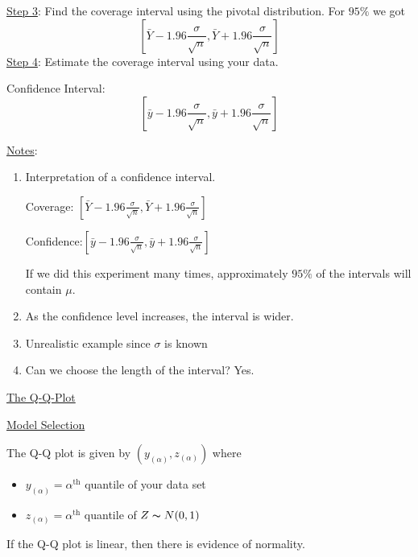 \underline{Step 3}: Find the coverage interval using the pivotal distribution.
For $ 95\% $ we got
\[ \left[ \bar{Y}-1.96\frac{\sigma}{\sqrt{n}},
        \bar{Y}+1.96\frac{\sigma}{\sqrt{n}}\right] \] \underline{Step 4}: Estimate
the coverage interval using your data.

Confidence Interval:
\[ \left[ \bar{y}-1.96\frac{\sigma}{\sqrt{n}},
        \bar{y}+1.96\frac{\sigma}{\sqrt{n}}\right] \]

\underline{Notes}:
\begin{enumerate}[label=(\roman*)]
    \item Interpretation of a confidence interval.
          
          Coverage: $ \left[ \bar{Y}-1.96\frac{\sigma}{\sqrt{n}},
                  \bar{Y}+1.96\frac{\sigma}{\sqrt{n}}\right] $
          
          Confidence:$ \left[ \bar{y}-1.96\frac{\sigma}{\sqrt{n}},
                  \bar{y}+1.96\frac{\sigma}{\sqrt{n}}\right] $
          
          If we did this experiment many times, approximately $ 95\% $ of the
          intervals will contain $ \mu $.
          
    \item As the confidence level increases, the interval is wider.
    \item Unrealistic example since $ \sigma $ is known
    \item Can we choose the length of the interval? Yes.
\end{enumerate}

\underline{The Q-Q-Plot}

\underline{Model Selection}

The Q-Q plot is given by $ (y_{(\alpha)},z_{(\alpha)}) $ where
\begin{itemize}
    \item $ y_{(\alpha)} = \alpha^{\text{th}} $ quantile of your data set
    \item $ z_{(\alpha)} = \alpha^{\text{th}}  $ quantile of $ Z \thicksim
              N(0,1) $
\end{itemize}
If the Q-Q plot is linear, then there is evidence of normality.

